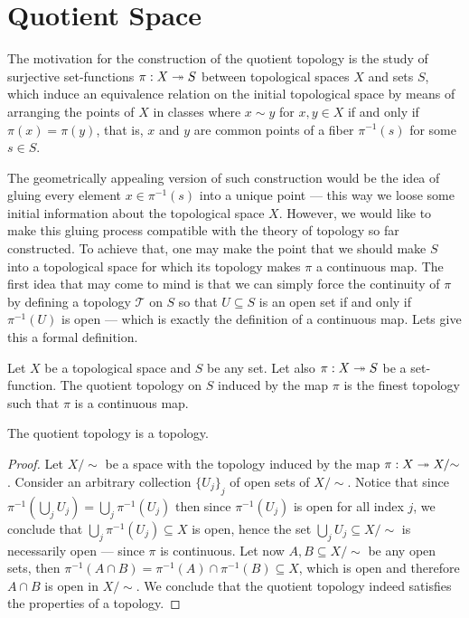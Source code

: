 \section{Quotient Space}

The motivation for the construction of the quotient topology is the study of
surjective set-functions \(\pi: X \twoheadrightarrow S\) between topological spaces \(X\) and
sets \(S\), which induce an equivalence relation on the initial topological
space by means of arranging the points of \(X\) in classes where \(x \sim y\)
for \(x, y \in X\) if and only if \(\pi(x) = \pi(y)\), that is, \(x\) and \(y\)
are common points of a fiber \(\pi^{-1}(s)\) for some \(s \in S\).

The geometrically appealing version of such construction would be the idea of
gluing every element \(x \in \pi^{-1}(s)\) into a unique point --- this way we
loose some initial information about the topological space \(X\). However, we
would like to make this gluing process compatible with the theory of topology so
far constructed. To achieve that, one may make the point that we should make
\(S\) into a topological space for which its topology makes \(\pi\) a continuous
map. The first idea that may come to mind is that we can simply force the
continuity of \(\pi\) by defining a topology \(\mathcal T\) on \(S\) so that \(U
\subseteq S\) is an open set if and only if \(\pi^{-1}(U)\) is open --- which is
exactly the definition of a continuous map. Lets give this a formal definition.

\begin{definition}\label{def:quotient-topology}
Let \(X\) be a topological space and \(S\) be any set. Let also \(\pi: X \twoheadrightarrow S\)
be a set-function. The quotient topology on \(S\) induced by the map \(\pi\) is
the finest topology such that \(\pi\) is a continuous map.
\end{definition}

\begin{proposition}
The quotient topology is a topology.
\end{proposition}

\begin{proof}
Let \(X /{\sim}\) be a space with the topology induced by the map \(\pi: X \twoheadrightarrow
X /{\sim}\). Consider an arbitrary collection \({\{U_{j}\}}_j\) of open sets of
\(X /{\sim}\). Notice that since \(\pi^{-1}(\bigcup_{j} U_{j}) = \bigcup_j
\pi^{-1}(U_j)\) then since \(\pi^{-1}(U_j)\) is open for all index \(j\), we
conclude that \(\bigcup_j \pi^{-1}(U_{j}) \subseteq X\) is open, hence the set
\(\bigcup_j U_j \subseteq X /{\sim}\) is necessarily open --- since \(\pi\) is
continuous. Let now \(A, B \subseteq X /{\sim}\) be any open sets, then
\(\pi^{-1}(A \cap B) = \pi^{-1}(A) \cap \pi^{-1}(B) \subseteq X\), which is open
and therefore \(A \cap B\) is open in \(X /{\sim}\). We conclude that the
quotient topology indeed satisfies the properties of a topology.
\end{proof}

